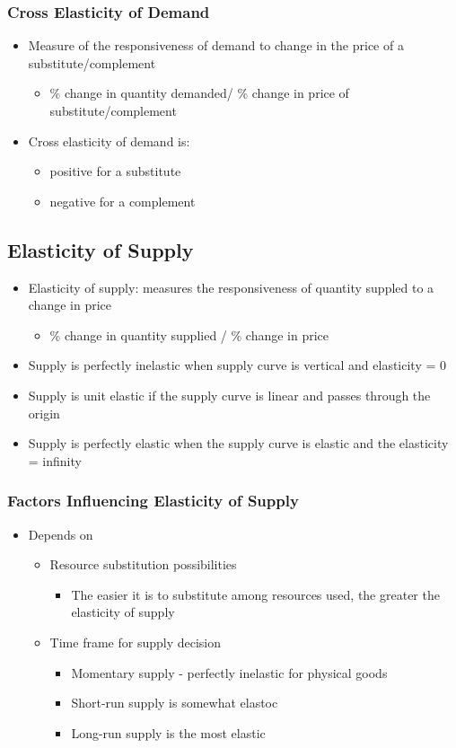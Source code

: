 \documentclass[11pt]{article}
\begin{document}
\subsubsection{Cross Elasticity of Demand}
\label{sec:org706423d}
\begin{itemize}
\item Measure of the responsiveness of demand to change in the price of a substitute/complement 
\begin{itemize}
\item \% change in quantity demanded/ \% change in price of substitute/complement
\end{itemize}
\item Cross elasticity of demand is:
\begin{itemize}
\item positive for a substitute
\item negative for a complement
\end{itemize}
\end{itemize}
\subsection{Elasticity of Supply}
\label{sec:org52d42ac}
\begin{itemize}
\item Elasticity of supply: measures the responsiveness of quantity suppled to a change in price
\begin{itemize}
\item \% change in quantity supplied / \% change in price
\end{itemize}
\item Supply is perfectly inelastic when supply curve is vertical and elasticity = 0
\item Supply is unit elastic if the supply curve is linear and passes through the origin
\item Supply is perfectly elastic when the supply curve is elastic and the elasticity = infinity
\end{itemize}
\subsubsection{Factors Influencing Elasticity of Supply}
\label{sec:org2795a99}
\begin{itemize}
\item Depends on
\begin{itemize}
\item Resource substitution possibilities
\begin{itemize}
\item The easier it is to substitute among resources used, the greater the elasticity of supply
\end{itemize}
\item Time frame for supply decision
\begin{itemize}
\item Momentary supply - perfectly inelastic for physical goods
\item Short-run supply is somewhat elastoc
\item Long-run supply is the most elastic
\end{itemize}
\end{itemize}
\end{itemize}
\end{document}

